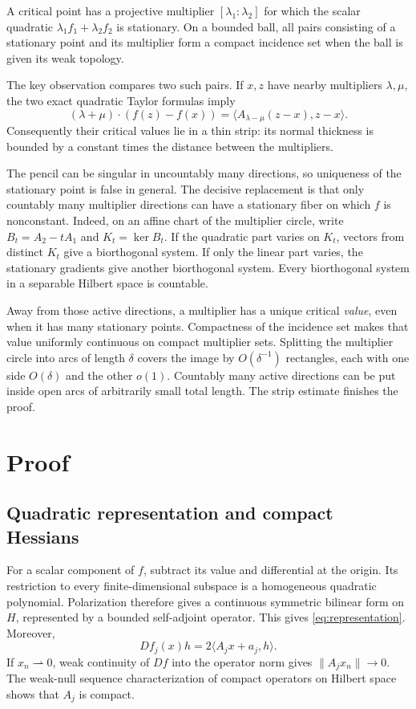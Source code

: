 \documentclass[11pt]{article}
\begin{document}
A critical point has a projective multiplier $[\lambda_1:\lambda_2]$ for
which the scalar quadratic $\lambda_1f_1+\lambda_2f_2$ is stationary. On a
bounded ball, all pairs consisting of a stationary point and its multiplier
form a compact incidence set when the ball is given its weak topology.

The key observation compares two such pairs. If $x,z$ have nearby
multipliers $\lambda,\mu$, the two exact quadratic Taylor formulas imply
\[
 (\lambda+\mu)\cdot(f(z)-f(x))
 =\langle A_{\lambda-\mu}(z-x),z-x\rangle.
\]
Consequently their critical values lie in a thin strip: its normal thickness
is bounded by a constant times the distance between the multipliers.

The pencil can be singular in uncountably many directions, so uniqueness of
the stationary point is false in general. The decisive replacement is that
only countably many multiplier directions can have a stationary fiber on
which $f$ is nonconstant. Indeed, on an affine chart of the multiplier circle,
write $B_t=A_2-tA_1$ and $K_t=\ker B_t$. If the quadratic part varies on
$K_t$, vectors from distinct $K_t$ give a biorthogonal system. If only the
linear part varies, the stationary gradients give another biorthogonal
system. Every biorthogonal system in a separable Hilbert space is countable.

Away from those active directions, a multiplier has a unique critical
\emph{value}, even when it has many stationary points. Compactness of the
incidence set makes that value uniformly continuous on compact multiplier
sets. Splitting the multiplier circle into arcs of length $\delta$ covers the
image by $O(\delta^{-1})$ rectangles, each with one side $O(\delta)$ and the
other $o(1)$. Countably many active directions can be put inside open arcs of
arbitrarily small total length. The strip estimate finishes the proof.

\section{Proof}

\subsection{Quadratic representation and compact Hessians}

For a scalar component of $f$, subtract its value and differential at the
origin. Its restriction to every finite-dimensional subspace is a homogeneous
quadratic polynomial. Polarization therefore gives a continuous symmetric
bilinear form on $H$, represented by a bounded self-adjoint operator. This
gives \eqref{eq:representation}. Moreover,
\[
 Df_j(x)h=2\langle A_jx+a_j,h\rangle.
\]
If $x_n\rightharpoonup0$, weak continuity of $Df$ into the operator norm gives
$\|A_jx_n\|\to0$. The weak-null sequence characterization of compact
operators on Hilbert space shows that $A_j$ is compact.
\end{document}
